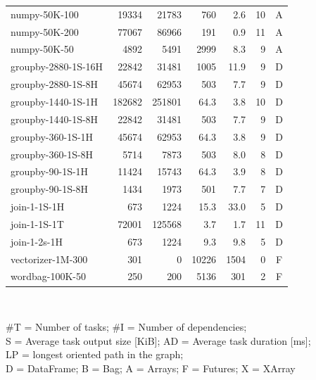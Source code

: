 \begin{table}
\begin{tabular}{l|rrrrrc}
		numpy-50K-100       & 19334        & 21783        & 760        & 2.6   & 10 & A \\
		numpy-50K-200       & 77067        & 86966        & 191        & 0.9   & 11 & A \\
		numpy-50K-50        & 4892         & 5491         & 2999       & 8.3   & 9  & A \\
		groupby-2880-1S-16H & 22842        & 31481        & 1005       & 11.9  & 9  & D \\
		groupby-2880-1S-8H  & 45674        & 62953        & 503        & 7.7   & 9  & D \\
		groupby-1440-1S-1H  & 182682       & 251801       & 64.3       & 3.8   & 10 & D \\
		groupby-1440-1S-8H  & 22842        & 31481        & 503        & 7.7   & 9  & D \\
		groupby-360-1S-1H   & 45674        & 62953        & 64.3       & 3.8   & 9  & D \\
		groupby-360-1S-8H   & 5714         & 7873         & 503        & 8.0   & 8  & D \\
		groupby-90-1S-1H    & 11424        & 15743        & 64.3       & 3.9   & 8  & D \\
		groupby-90-1S-8H    & 1434         & 1973         & 501        & 7.7   & 7  & D \\
		join-1-1S-1H        & 673          & 1224         & 15.3       & 33.0  & 5  & D \\
		join-1-1S-1T        & 72001        & 125568       & 3.7        & 1.7   & 11 & D \\
		join-1-2s-1H        & 673          & 1224         & 9.3        & 9.8   & 5  & D \\
		vectorizer-1M-300   & 301          & 0            & 10226      & 1504  & 0  & F \\
		wordbag-100K-50     & 250          & 200          & 5136       & 301   & 2  & F \\
		\bottomrule
	\end{tabular}\\
	\vspace{1mm}

	\#T = Number of tasks; \#I = Number of dependencies; \\
	S = Average task output size [KiB]; AD = Average task
	duration [ms]; \\ LP = longest oriented path in the graph; \\ D = DataFrame; B =
	Bag; A = Arrays; F = Futures; X = XArray
\end{table}

